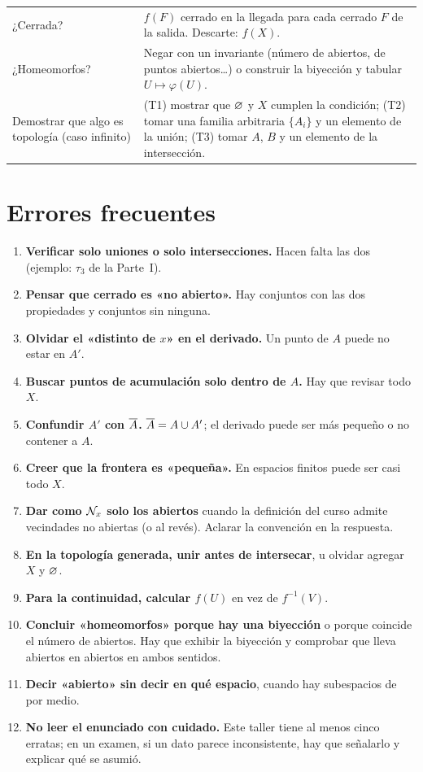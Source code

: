 \begin{center}
\begin{longtable}{@{}p{4.3cm}p{11.1cm}@{}}
¿Cerrada? & $f(F)$ cerrado en la llegada para cada cerrado $F$ de la salida. Descarte: $f(X)$.\\
¿Homeomorfos? & Negar con un invariante (número de abiertos, de puntos abiertos\dots) o construir la biyección y
tabular $U\mapsto\varphi(U)$.\\
Demostrar que algo es topología (caso infinito) & (T1) mostrar que $\varnothing$ y $X$ cumplen la condición; (T2) tomar una
familia arbitraria $\{A_i\}$ y un elemento de la unión; (T3) tomar $A$, $B$ y un elemento de la intersección.\\ \bottomrule
\end{longtable}
\end{center}

\section{Errores frecuentes}
\begin{enumerate}[leftmargin=1.8em,itemsep=0.35em]
\item \textbf{Verificar solo uniones o solo intersecciones.} Hacen falta las dos (ejemplo: $\tau_3$ de la Parte~I).
\item \textbf{Pensar que cerrado es «no abierto».} Hay conjuntos con las dos propiedades y conjuntos sin ninguna.
\item \textbf{Olvidar el «distinto de $x$» en el derivado.} Un punto de $A$ puede no estar en $A'$.
\item \textbf{Buscar puntos de acumulación solo dentro de $A$.} Hay que revisar todo $X$.
\item \textbf{Confundir $A'$ con $\overline{A}$.} $\overline{A}=A\cup A'$; el derivado puede ser más pequeño o no contener a $A$.
\item \textbf{Creer que la frontera es «pequeña».} En espacios finitos puede ser casi todo $X$.
\item \textbf{Dar como $\mathcal{N}_x$ solo los abiertos} cuando la definición del curso admite vecindades no abiertas (o al
revés). Aclarar la convención en la respuesta.
\item \textbf{En la topología generada, unir antes de intersecar}, u olvidar agregar $X$ y $\varnothing$.
\item \textbf{Para la continuidad, calcular $f(U)$} en vez de $f^{-1}(V)$.
\item \textbf{Concluir «homeomorfos» porque hay una biyección} o porque coincide el número de abiertos. Hay que
exhibir la biyección y comprobar que lleva abiertos en abiertos en ambos sentidos.
\item \textbf{Decir «abierto» sin decir en qué espacio}, cuando hay subespacios de por medio.
\item \textbf{No leer el enunciado con cuidado.} Este taller tiene al menos cinco erratas; en un examen, si un dato
parece inconsistente, hay que señalarlo y explicar qué se asumió.
\end{enumerate}

